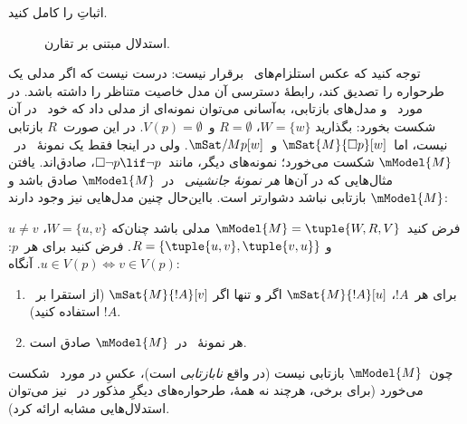 \documentclass[../../../include/open-logic-section]{subfiles}
\begin{document}
\begin{prob}
  اثباتِ  را کامل کنید.
\end{prob}

\begin{figure}
  \begin{center}
  \end{center}
\caption{استدلال مبتنی بر تقارن.}
\end{figure}

توجه کنید که عکس استلزام‌های~ برقرار نیست: درست
نیست که اگر مدلی یک طرحواره را تصدیق کند، رابطهٔ دسترسی آن مدل خاصیت
متناظر را داشته باشد. در مورد~ و مدل‌های بازتابی، به‌آسانی می‌توان
نمونه‌ای از مدلی داد که خود~ در آن شکست بخورد: بگذارید
$W = \{w\}$، $R = \emptyset$ و~$V(p) = \emptyset$. در این صورت~$R$
بازتابی نیست، اما~$\mSat{M}{\Box p}[w]$ و~$\mSat/{M}{p}[w]$. ولی در
اینجا فقط یک نمونهٔ~ در~$\mModel{M}$ شکست می‌خورد؛ نمونه‌های دیگر،
مانند~$\Box \lnot p \lif \lnot p$، صادق‌اند. یافتن مثال‌هایی که در
آن‌ها \emph{هر نمونهٔ جانشینی}~ در~$\mModel{M}$ صادق باشد و
$\mModel{M}$ بازتابی نباشد دشوارتر است. بااین‌حال چنین مدل‌هایی نیز
وجود دارند:

\begin{prop}
  فرض کنید~$\mModel{M} = \tuple{W, R, V}$ مدلی باشد چنان‌که
  $W = \{u, v\}$، $u \neq v$ و
  $R = \{\tuple{u,v},\tuple{v,u}\}$. فرض کنید برای هر~$p$:
  $u \in V(p) \Leftrightarrow v \in V(p)$. آنگاه:
  \begin{enumerate}
  \item برای هر~$!A$، $\mSat{M}{!A}[u]$ اگر و تنها اگر
    $\mSat{M}{!A}[v]$ (از استقرا بر~$!A$ استفاده کنید).
  \item هر نمونهٔ~ در~$\mModel{M}$ صادق است.
  \end{enumerate}
  چون~$\mModel{M}$ بازتابی نیست (در واقع \emph{نابازتابی} است)، عکسِ
   در مورد~ شکست می‌خورد (برای برخی، هرچند
  نه همهٔ، طرحواره‌های دیگرِ مذکور در~ نیز
  می‌توان استدلال‌هایی مشابه ارائه کرد).
\end{prop}
\end{document}
